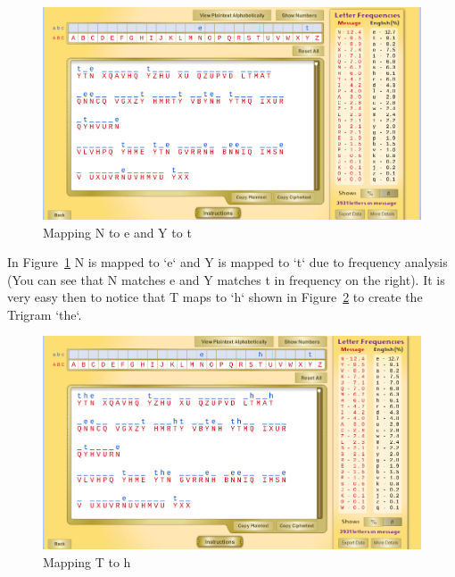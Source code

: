 \documentclass[12pt]{article}
\begin{document}
\begin{figure}[H]
    \begin{center}
        \includegraphics[scale=0.48]{c4.png}
    \end{center}{}
    \caption{Mapping N to e and Y to t}
    \label{fig:c4}
\end{figure}

In Figure~\ref{fig:c4} N is mapped to `e` and Y is mapped to `t` due to frequency analysis (You can see that N matches e
and Y matches t in frequency on the right). It is very easy then to notice that T maps to `h` shown in
Figure~\ref{fig:c5} to create the Trigram `the`.

\begin{figure}[H]
    \begin{center}
        \includegraphics[scale=0.48]{c5.png}
    \end{center}{}
    \caption{Mapping T to h}
    \label{fig:c5}
\end{figure}
\end{document}
